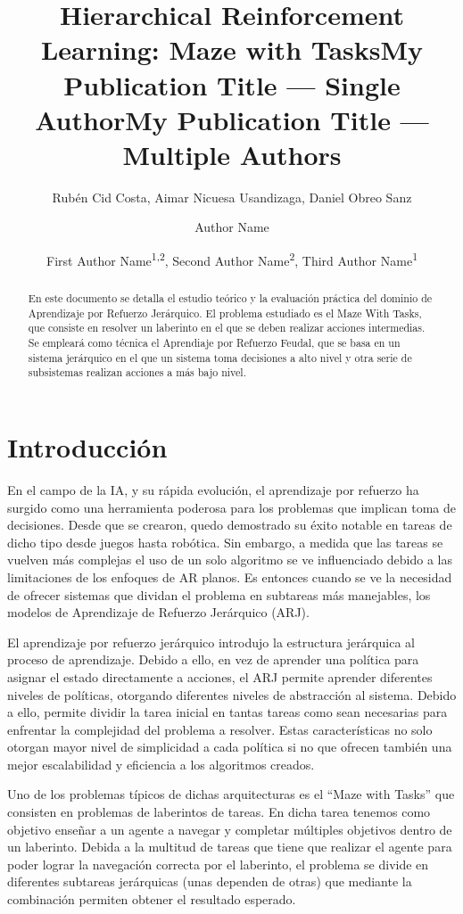 \documentclass[letterpaper]{article} %
\title{Hierarchical Reinforcement Learning: Maze with Tasks}
\author{
    Rubén Cid Costa, Aimar Nicuesa Usandizaga, Daniel Obreo Sanz
}
\title{My Publication Title --- Single Author}
\author {
    Author Name
}
\title{My Publication Title --- Multiple Authors}
\author {
    First Author Name\textsuperscript{\rm 1,\rm 2},
    Second Author Name\textsuperscript{\rm 2},
    Third Author Name\textsuperscript{\rm 1}
}
\begin{document}
\maketitle

\begin{abstract}
En este documento se detalla el estudio teórico y la evaluación práctica del dominio de Aprendizaje por Refuerzo Jerárquico. El problema estudiado es el Maze With Tasks, que consiste en resolver un laberinto en el que se deben realizar acciones intermedias. Se empleará como técnica el Aprendiaje por Refuerzo Feudal, que se basa en un sistema jerárquico en el que un sistema toma decisiones a alto nivel y otra serie de subsistemas realizan acciones a más bajo nivel.
\end{abstract}


\section{Introducción}
En el campo de la IA, y su rápida evolución, el aprendizaje por refuerzo ha surgido como una herramienta poderosa para los problemas que implican toma de decisiones. Desde que se crearon, quedo demostrado su éxito notable en tareas de dicho tipo desde juegos hasta robótica. Sin embargo, a medida que las tareas se vuelven más complejas el uso de un solo algoritmo se ve influenciado debido a las limitaciones de los enfoques de AR planos. Es entonces cuando se ve la necesidad de ofrecer sistemas que dividan el problema en subtareas más manejables, los modelos de Aprendizaje de Refuerzo Jerárquico (ARJ).

El aprendizaje por refuerzo jerárquico introdujo la estructura jerárquica al proceso de aprendizaje. Debido a ello, en vez de aprender una política para asignar el estado directamente a acciones, el ARJ permite aprender diferentes niveles de políticas, otorgando diferentes niveles de abstracción al sistema. Debido a ello, permite dividir la tarea inicial en tantas tareas como sean necesarias para enfrentar la complejidad del problema a resolver. Estas características no solo otorgan mayor nivel de simplicidad a cada política si no que ofrecen también una mejor escalabilidad y eficiencia a los algoritmos creados.

Uno de los problemas típicos de dichas arquitecturas es el “Maze with Tasks” que consisten en problemas de laberintos de tareas. En dicha tarea tenemos como objetivo enseñar a un agente a navegar y completar múltiples objetivos dentro de un laberinto. Debida a la multitud de tareas que tiene que realizar el agente para poder lograr la navegación correcta por el laberinto, el problema se divide en diferentes subtareas jerárquicas (unas dependen de otras) que mediante la combinación permiten obtener el resultado esperado.
\end{document}
